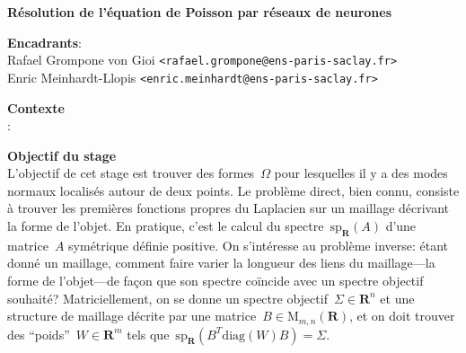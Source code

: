 \documentclass[a4paper,11pt]{article}
\begin{document}
\thispagestyle{empty}

{\bf
	Résolution de l'équation de Poisson par réseaux de neurones
}

{\bf Encadrants}:\\
Rafael Grompone von Gioi \verb+<rafael.grompone@ens-paris-saclay.fr>+\\
Enric Meinhardt-Llopis \verb+<enric.meinhardt@ens-paris-saclay.fr>+ 

{\bf Contexte}\\
:


{\bf Objectif du stage}\\
L'objectif de cet stage est trouver des formes~$\Omega$ pour lesquelles il y a
des modes normaux localisés autour de deux points.
Le problème direct, bien connu, consiste à trouver
les premières fonctions propres du Laplacien sur un maillage décrivant la forme
de l'objet.  En pratique, c'est le calcul du
spectre~$\mathrm{sp}_{\mathbf{R}}(A)$ d'une matrice~$A$ symétrique définie
positive.
On s'intéresse au problème inverse: étant donné un maillage, comment faire
varier la longueur des liens du maillage---la forme de l'objet---de façon que
son spectre coïncide avec un spectre objectif souhaité?
Matriciellement, on se donne un spectre
objectif~$\Sigma\in\mathbf{R}^n$ et une structure de maillage décrite par une
matrice~$B\in\mathrm{M}_{m,n}(\mathbf{R})$, et on doit trouver des
``poids''~$W\in\mathbf{R}^m$ tels
que~$\mathrm{sp}_\mathbf{R}\left(B^T\mathrm{diag}(W)B\right)=\Sigma$.

\end{document}
